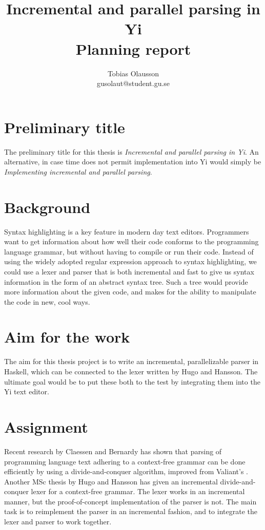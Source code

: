 \documentclass[a4paper,12pt]{article}
\title{Incremental and parallel parsing in Yi \\ 
       \small{Planning report}}
\author{Tobias Olausson \\ \small{gusolaut@student.gu.se}}
\date{}
\begin{document}
\maketitle

\section*{Preliminary title}
The preliminary title for this thesis is \textit{Incremental and parallel
parsing in Yi}. An alternative, in case time does not permit implementation into
Yi would simply be \textit{Implementing incremental and parallel parsing}.

\section*{Background}
Syntax highlighting is a key feature in modern day text editors. Programmers
want to get information about how well their code conforms to the programming
language grammar, but without having to compile or run their code. Instead of
using the widely adopted regular expression approach to syntax highlighting, we
could use a lexer and parser that is both incremental and fast to give us syntax
information in the form of an abstract syntax tree. Such a tree would provide
more information about the given code, and makes for the ability to manipulate
the code in new, cool ways.

\section*{Aim for the work}
The aim for this thesis project is to write an incremental, parallelizable
parser in Haskell, which can be connected to the lexer written by Hugo and
Hansson\cite{hugohansson}. The ultimate goal would be to put these both to the
test by integrating them into the Yi text editor.

\section*{Assignment}
Recent research by Claessen and Bernardy\cite{parparsepaper} has shown that
parsing of programming language text adhering to a context-free grammar can be
done efficiently by using a divide-and-conquer algorithm, improved from
Valiant's \cite{valiant}.  Another MSc thesis by Hugo and Hansson has given an
incremental divide-and-conquer lexer for a context-free grammar. The lexer works
in an incremental manner, but the proof-of-concept implementation of the parser
is not. The main task is to reimplement the parser in an incremental fashion,
and to integrate the lexer and parser to work together. 
\end{document}
